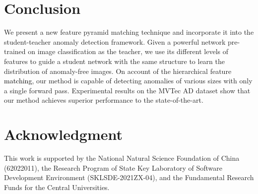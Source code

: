 \documentclass{bmvc2k}
\newcommand{\wgd}[1]{\textcolor{black}{{}#1}}
\begin{document}
\section{Conclusion}
\label{sec6}


We present a new feature pyramid matching technique and incorporate it into the student-teacher anomaly detection framework. Given a powerful network pre-trained on image classification as the teacher, we use its different levels of features to guide a student network with the same structure to learn the distribution of anomaly-free images. On account of the hierarchical feature \wgd{matching}, our method is capable of detecting anomalies of various sizes with only a single forward pass. Experimental results on the MVTec AD dataset show that our method achieves superior performance to the state-of-the-art.



\section*{Acknowledgment}
This work is supported by the National Natural Science Foundation of China (62022011), the Research Program of State Key Laboratory of Software Development Environment (SKLSDE-2021ZX-04), and the Fundamental Research Funds for the Central Universities. 





\end{document}
